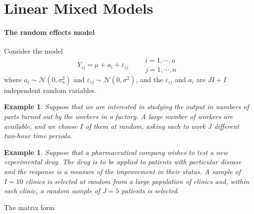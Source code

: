 \documentclass{article}
\newtheorem{example}[theorem]{Example}
\begin{document}
\section{Linear Mixed Models}

\paragraph{The random effects model}

Consider the model%
\begin{equation*}
Y_{ij}=\mu +a_{i}+\varepsilon _{ij}\qquad 
\begin{array}{c}
i=1,\cdots ,a \\ 
j=1,\cdots ,n%
\end{array}%
\end{equation*}%
where $a_{i}\sim \mathcal{N}\left( 0,\sigma _{a}^{2}\right) $ and $%
\varepsilon _{ij}\sim \mathcal{N}\left( 0,\sigma ^{2}\right) $, and the $%
\varepsilon _{ij}$ and $a_{i}$ are $JI+I$ independent random variables.

\begin{example}
Suppose that we are interested in studying the output in numbers of parts
turned out by the workers in a factory. A large number of workers are
available, and we choose $I$ of them at random, asking each to work $J$
different two-hour time periods.
\end{example}

\begin{example}
Suppose that a pharmaceutical company wishes to test a new experimental
drug. The drug is to be applied to patients with particular disease and the
response is a measure of the improvement in their status. A sample of $I=10$
clinics is selected at random from a large population of clinics and, within
each clinic, a random sample of $J=5$ patients is selected.
\end{example}

\bigskip

The matrix form
\end{document}

